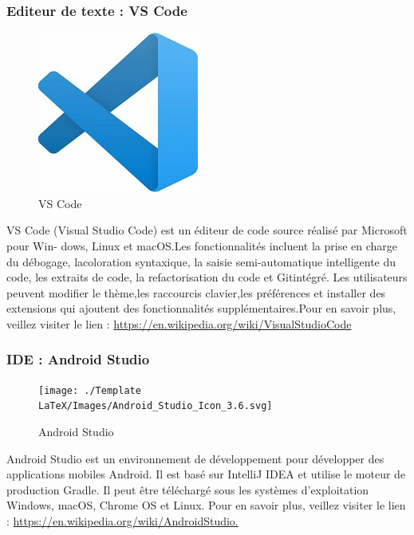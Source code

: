 \subsubsection{Editeur de texte : VS Code}
\begin{figure}[h]
	\includegraphics[scale=0.4]{./Template LaTeX/Images/VSCode.jpg}
	\centering
	\caption{VS Code}
\end{figure}
VS Code (Visual Studio Code) est un éditeur de code source réalisé par Microsoft pour Win-
dows, Linux et macOS.Les fonctionnalités incluent la prise en charge du débogage, lacoloration
syntaxique, la saisie semi-automatique intelligente du code, les extraits de code, la refactorisation du
code et Gitintégré. Les utilisateurs peuvent modifier le thème,les raccourcis clavier,les préférences et
installer des extensions qui ajoutent des fonctionnalités supplémentaires.\newline Pour en savoir plus, veillez
visiter le lien : \href{https://en.wikipedia.org/wiki/VisualStudioCode}{https://en.wikipedia.org/wiki/VisualStudioCode}
\subsubsection{IDE : Android Studio}
\begin{figure}[h]
	\texttt{[image: ./Template LaTeX/Images/Android\_Studio\_Icon\_3.6.svg]}
	\centering
	\caption{Android Studio}
\end{figure}
Android Studio est un environnement de développement pour développer des applications mobiles Android. Il est basé sur IntelliJ IDEA et utilise le moteur de production Gradle. Il peut être téléchargé sous les systèmes d'exploitation Windows, macOS, Chrome OS et Linux.
\newline Pour en savoir plus, veillez
visiter le lien : \href{https://en.wikipedia.org/wiki/AndroidStudio.}{https://en.wikipedia.org/wiki/AndroidStudio.}
